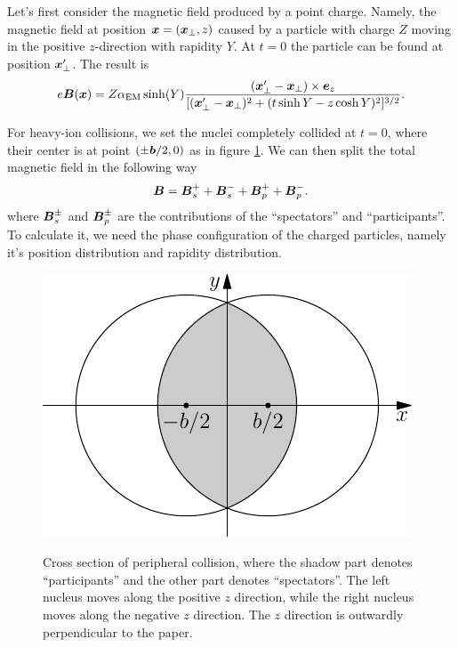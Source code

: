 \documentclass{cweb}
\begin{document}
Let's first consider the magnetic field produced by a point charge.
Namely, the magnetic field at position $\vb*{x} = (\vb*{x}_\perp , z)$ caused
by a particle with charge $Z$ moving in the positive $z$-direction with
rapidity $Y$. At $t = 0$ the particle can be found at position $\vb*{x}'_%
\perp$. The result is
\begin{equation}
e\vb*{B}(\vb*{x}) = Z \alpha_{\text{EM}} \sinh(Y) \frac{(\vb*{x}'_\perp - %
\vb*{x}_\perp) \times \vb*{e}_z}{[(\vb*{x}'_\perp - \vb*{x}_\perp)^2 + (t\sinh
Y - z \cosh Y)^2]^{3/2}}.
\end{equation}

For heavy-ion collisions, we set the nuclei completely collided at $t = 0$,
where their center is at point $(\pm\vb*{b}/2,0)$ as in figure \ref{fig01}. We
can then split the total magnetic field in the following way
\begin{equation}
\vb*{B} = \vb*{B}_s^+ + \vb*{B}_s^- + \vb*{B}_p^+ + \vb*{B}_p^-.
\end{equation}
where $\vb*{B}_s^\pm$ and $\vb*{B}_p^\pm$ are the contributions of the
``spectators'' and ``participants''. To calculate it, we need the phase
configuration of the charged particles, namely it's position distribution and
rapidity distribution.

\begin{figure}
\centering
\includegraphics[scale=1]{fig1}\\
\caption{Cross section of peripheral collision, where the shadow part denotes
``participants'' and the other part denotes ``spectators''. The left nucleus
moves along the positive $z$ direction, while the right nucleus moves along the
negative $z$ direction. The $z$ direction is outwardly perpendicular to the
paper.}\label{fig01}
\end{figure}
\end{document}
